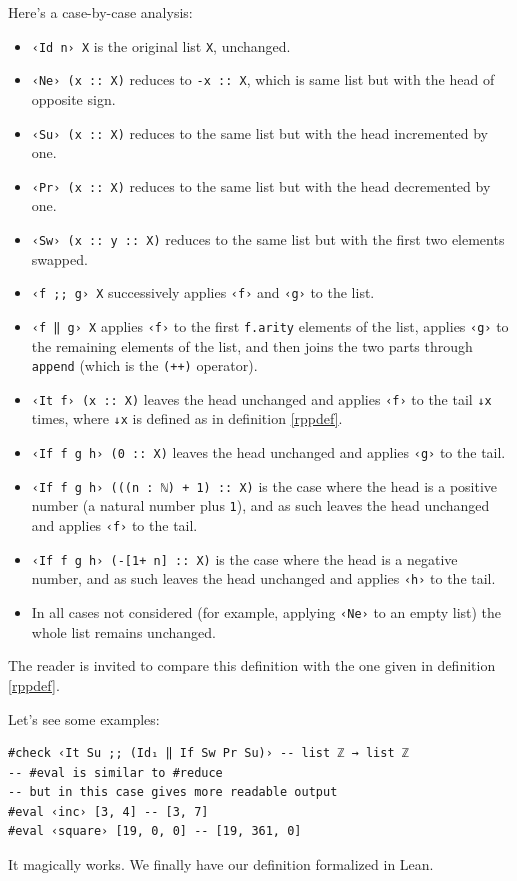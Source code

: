 \documentclass[oneside]{book}
\theoremstyle{definition}
\theoremstyle{remark}
\theoremstyle{plain}
\begin{document}
Here's a case-by-case analysis:
\begin{itemize}
\item \lstinline{‹Id n› X} is the original list \lstinline{X}, unchanged.
\item \lstinline{‹Ne› (x :: X)} reduces to \lstinline{-x :: X}, which is same list but with the head of opposite sign.
\item \lstinline{‹Su› (x :: X)} reduces to the same list but with the head incremented by one.
\item \lstinline{‹Pr› (x :: X)} reduces to the same list but with the head decremented by one.
\item \lstinline{‹Sw› (x :: y :: X)} reduces to the same list but with the first two elements swapped.
\item \lstinline{‹f ;; g› X} successively applies \lstinline{‹f›} and \lstinline{‹g›} to the list.
\item \lstinline{‹f ‖ g› X} applies \lstinline{‹f›} to the first \lstinline{f.arity} elements of the list,
applies \lstinline{‹g›} to the remaining elements of the list,
and then joins the two parts through \lstinline{append} (which is the \lstinline{(++)} operator).
\item \lstinline{‹It f› (x :: X)} leaves the head unchanged and applies \lstinline{‹f›} to the tail \lstinline{↓x} times,
where \lstinline{↓x} is defined as in definition \ref{rppdef}.
\item \lstinline{‹If f g h› (0 :: X)} leaves the head unchanged and applies \lstinline{‹g›} to the tail.
\item \lstinline{‹If f g h› (((n : ℕ) + 1) :: X)} is the case where the head is a positive number
(a natural number plus \lstinline{1}),
and as such leaves the head unchanged and applies \lstinline{‹f›} to the tail.
\item \lstinline{‹If f g h› (-[1+ n] :: X)} is the case where the head is a negative number,
and as such leaves the head unchanged and applies \lstinline{‹h›} to the tail.
\item In all cases not considered (for example, applying \lstinline{‹Ne›} to an empty list) the whole list remains unchanged. 
\end{itemize}

The reader is invited to compare this definition with the one given in definition \ref{rppdef}.

Let's see some examples:
\begin{lstlisting}
#check ‹It Su ;; (Id₁ ‖ If Sw Pr Su)› -- list ℤ → list ℤ
-- #eval is similar to #reduce
-- but in this case gives more readable output
#eval ‹inc› [3, 4] -- [3, 7]
#eval ‹square› [19, 0, 0] -- [19, 361, 0]
\end{lstlisting}
It magically works. We finally have our definition formalized in Lean.
\end{document}
